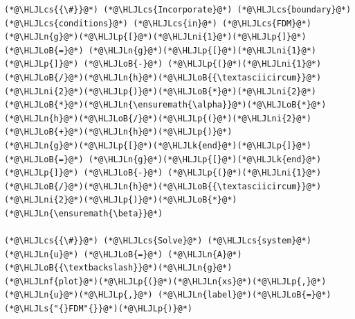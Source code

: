 \documentclass[12pt,a4paper]{article}
\newcommand{\HLJLk}[1]{\textcolor[RGB]{148,91,176}{\textbf{#1}}}
\newcommand{\HLJLn}[1]{#1}
\newcommand{\HLJLnf}[1]{\textcolor[RGB]{66,102,213}{#1}}
\newcommand{\HLJLs}[1]{\textcolor[RGB]{201,61,57}{#1}}
\newcommand{\HLJLni}[1]{\textcolor[RGB]{59,151,46}{#1}}
\newcommand{\HLJLoB}[1]{\textcolor[RGB]{102,102,102}{\textbf{#1}}}
\newcommand{\HLJLp}[1]{#1}
\newcommand{\HLJLcs}[1]{\textcolor[RGB]{153,153,119}{\textit{#1}}}
\begin{document}
\begin{lstlisting}
(*@\HLJLcs{{\#}}@*) (*@\HLJLcs{Incorporate}@*) (*@\HLJLcs{boundary}@*) (*@\HLJLcs{conditions}@*) (*@\HLJLcs{in}@*) (*@\HLJLcs{FDM}@*)
(*@\HLJLn{g}@*)(*@\HLJLp{[}@*)(*@\HLJLni{1}@*)(*@\HLJLp{]}@*) (*@\HLJLoB{=}@*) (*@\HLJLn{g}@*)(*@\HLJLp{[}@*)(*@\HLJLni{1}@*)(*@\HLJLp{]}@*) (*@\HLJLoB{-}@*) (*@\HLJLp{(}@*)(*@\HLJLni{1}@*)(*@\HLJLoB{/}@*)(*@\HLJLn{h}@*)(*@\HLJLoB{{\textasciicircum}}@*)(*@\HLJLni{2}@*)(*@\HLJLp{)}@*)(*@\HLJLoB{*}@*)(*@\HLJLni{2}@*)(*@\HLJLoB{*}@*)(*@\HLJLn{\ensuremath{\alpha}}@*)(*@\HLJLoB{*}@*)(*@\HLJLn{h}@*)(*@\HLJLoB{/}@*)(*@\HLJLp{(}@*)(*@\HLJLni{2}@*)(*@\HLJLoB{+}@*)(*@\HLJLn{h}@*)(*@\HLJLp{)}@*)
(*@\HLJLn{g}@*)(*@\HLJLp{[}@*)(*@\HLJLk{end}@*)(*@\HLJLp{]}@*) (*@\HLJLoB{=}@*) (*@\HLJLn{g}@*)(*@\HLJLp{[}@*)(*@\HLJLk{end}@*)(*@\HLJLp{]}@*) (*@\HLJLoB{-}@*) (*@\HLJLp{(}@*)(*@\HLJLni{1}@*)(*@\HLJLoB{/}@*)(*@\HLJLn{h}@*)(*@\HLJLoB{{\textasciicircum}}@*)(*@\HLJLni{2}@*)(*@\HLJLp{)}@*)(*@\HLJLoB{*}@*)(*@\HLJLn{\ensuremath{\beta}}@*)

(*@\HLJLcs{{\#}}@*) (*@\HLJLcs{Solve}@*) (*@\HLJLcs{system}@*)
(*@\HLJLn{u}@*) (*@\HLJLoB{=}@*) (*@\HLJLn{A}@*)(*@\HLJLoB{{\textbackslash}}@*)(*@\HLJLn{g}@*)
(*@\HLJLnf{plot}@*)(*@\HLJLp{(}@*)(*@\HLJLn{xs}@*)(*@\HLJLp{,}@*) (*@\HLJLn{u}@*)(*@\HLJLp{,}@*) (*@\HLJLn{label}@*)(*@\HLJLoB{=}@*)(*@\HLJLs{"{}FDM"{}}@*)(*@\HLJLp{)}@*)


\end{lstlisting}
\end{document}
